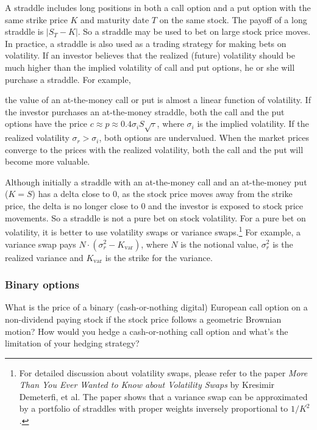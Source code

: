 \begin{solution}
A straddle includes long positions in both a call option and a put option with the same
strike price $K$ and maturity date $T$ on the same stock. The payoff of a long straddle is
$|S_T-K|$. So a straddle may be used to bet on large stock price moves. In practice, a
straddle is also used as a trading strategy for making bets on volatility. If an investor
believes that the realized (future) volatility should be much higher than the implied
volatility of call and put options, he or she will purchase a straddle. For example,


the value of an at-the-money call or put is almost a linear function of volatility. If the
investor purchases an at-the-money straddle, both the call and the put options have the
price $c\approx p\approx0.4\sigma_iS\sqrt{\tau}$, where $\sigma_i$ is the implied
volatility. If the realized volatility $\sigma_r>\sigma_i$, both options are undervalued.
When the market prices converge to the prices with the realized volatility, both the call
and the put will become more valuable.

Although initially a straddle with an at-the-money call and an at-the-money put ($K=S$)
has a delta close to 0, as the stock price moves away from the strike price, the delta is no
longer close to 0 and the investor is exposed to stock price movements. So a straddle is
not a pure bet on stock volatility. For a pure bet on volatility, it is better to use volatility
swaps or variance swaps.\footnote[11]{For detailed discussion about volatility swaps, please refer to the paper \emph{More Than You Ever Wanted to Know about Volatility Swaps} by Kresimir Demeterfi, et al. The paper shows that a variance swap can be approximated by a portfolio of straddles with proper weights inversely proportional to $1/K^2$.} For example, a
variance swap pays $N\cdot(\sigma_r^2-K_{\mathrm{var}})$, where $N$ is the notional
value, $\sigma_r^2$ is the realized variance and $K_{\mathrm{var}}$ is the strike for the
variance.

\end{solution}

\subsubsection*{Binary options}

\begin{problem}{What is the price of a binary (cash-or-nothing digital) European call option on a
non-dividend paying stock if the stock price follows a geometric Brownian motion? How
would you hedge a cash-or-nothing call option and what's the limitation of your hedging
strategy?}
\end{problem}

